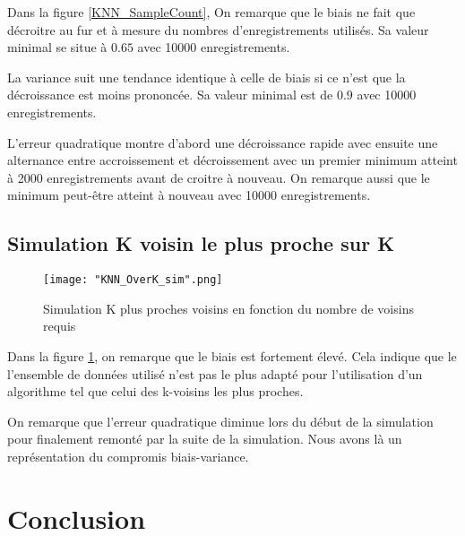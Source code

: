 \documentclass[a4paper]{article}
\begin{document}
Dans la figure \ref{KNN_SampleCount}, On remarque que le biais ne fait que décroitre au fur et à mesure du nombres d'enregistrements utilisés. Sa valeur minimal se situe à $0.65$ avec 10000 enregistrements. \newline

La variance suit une tendance identique à celle de biais si ce n'est que la décroissance est moins prononcée. Sa valeur minimal est de $0.9$ avec 10000 enregistrements. \newline 

L'erreur quadratique montre d'abord une décroissance rapide avec ensuite une alternance entre accroissement et décroissement avec un premier minimum atteint à 2000 enregistrements avant de croitre à nouveau. On remarque aussi que le minimum peut-être atteint à nouveau avec 10000 enregistrements.

\newpage

\subsection{Simulation K voisin le plus proche sur K}

\begin{figure}[!h]
	\centering
	\texttt{[image: "KNN\_OverK\_sim".png]}
	\caption{Simulation K plus proches voisins en fonction du nombre de voisins requis}
	\label{KNN_Over_K}
\end{figure}

Dans la figure \ref{KNN_Over_K}, on remarque que le biais est fortement élevé. Cela indique que le l'ensemble de données utilisé n'est pas le plus adapté pour l'utilisation d'un algorithme tel que celui des k-voisins les plus proches. \newline

On remarque que l'erreur quadratique diminue lors du début de la simulation pour finalement remonté par la suite de la simulation. Nous avons là un représentation du compromis biais-variance. \newline


\newpage

\section{Conclusion}

\newpage
\end{document}
